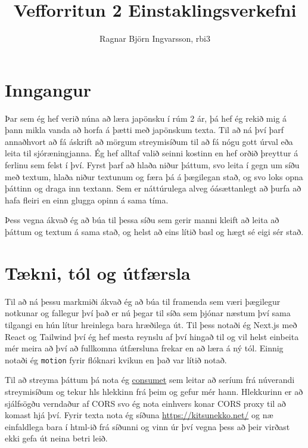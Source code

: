 \documentclass{article}
\title{Vefforritun 2 Einstaklingsverkefni}
\author{Ragnar Björn Ingvarsson, rbi3}
\begin{document}
\renewcommand\thepage{}

	\maketitle

	\newpage
	\setcounter{page}{1}
	\renewcommand\thepage{\arabic{page}}

	\section{Inngangur}
	Þar sem ég hef verið núna að læra japönsku í rúm 2 ár, þá hef ég rekið mig á þann mikla vanda að horfa á þætti með japönskum texta. 
	Til að ná því þarf annaðhvort að fá áskrift að mörgum streymisíðum til að fá nógu gott úrval eða leita til sjóræningjanna. Ég hef alltaf valið seinni kostinn 
	en hef orðið þreyttur á ferlinu sem felst í því. Fyrst þarf að hlaða niður þáttum, svo leita í gegn um síðu með textum, hlaða niður textunum og færa þá á 
	þægilegan stað, og svo loks opna þáttinn og draga inn textann. Sem er náttúrulega alveg óásættanlegt að þurfa að hafa fleiri en einn glugga opinn á sama tíma. 
	
	Þess vegna ákvað ég að búa til þessa síðu sem gerir manni kleift að leita að þáttum og textum á sama stað, og helst að eins lítið basl og hægt sé eigi sér stað. 
	\section{Tækni, tól og útfærsla}
	Til að ná þessu markmiði ákvað ég að búa til framenda sem væri þægilegur notkunar og fallegur því það er nú þegar til síða sem þjónar næstum því sama tilgangi 
	en hún lítur hreinlega bara hræðilega út. Til þess notaði ég Next.js með React og Tailwind því ég hef mesta reynslu af því hingað til og vil helst einbeita 
	mér meira að því að fullkomna útfærsluna frekar en að læra á ný tól. Einnig notaði ég \texttt{motion} fyrir flóknari kvikun en það var lítið notað.

	Til að streyma þáttum þá nota ég \href{https://github.com/consumet/api.consumet.org}{consumet} sem leitar að seríum frá núverandi streymisíðum og tekur hls 
	hlekkinn frá þeim og gefur mér hann. Hlekkurinn er að sjálfsögðu verndaður af CORS svo ég nota einhvers konar CORS proxy til að komast hjá því. Fyrir texta 
	nota ég síðuna \href{https://kitsunekko.net/}{https://kitsunekko.net/} og næ einfaldlega bara í html-ið frá síðunni og vinn úr því vegna þess að þeir virðast 
	ekki gefa út neina betri leið.
\end{document}

